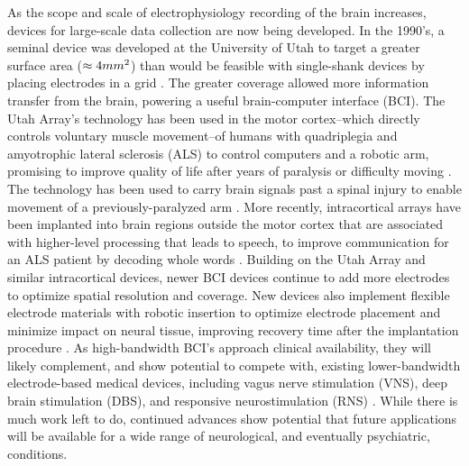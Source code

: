 \documentclass[11pt]{article}
\begin{document}
As the scope and scale of electrophysiology recording of the brain increases, devices for large-scale data collection are now being developed. In the 1990's, a seminal device was developed at the University of Utah to target a greater surface area ($\approx4mm\textsuperscript{2}$) than would be feasible with single-shank devices by placing electrodes in a grid \cite{maynard1997utaharray}. The greater coverage allowed more information transfer from the brain, powering a useful brain-computer interface (BCI). The Utah Array's technology has been used in the motor cortex--which directly controls voluntary muscle movement--of humans with quadriplegia and amyotrophic lateral sclerosis (ALS) to control computers and a robotic arm, promising to improve quality of life after years of paralysis or difficulty moving \cite{kim2008braingate, simeral2011braingate, hochberg2012reach, bacher2015bg}. The technology has been used to carry brain signals past a spinal injury to enable movement of a previously-paralyzed arm \cite{ajiboye2017bciarm}. More recently, intracortical arrays have been implanted into brain regions outside the motor cortex that are associated with higher-level processing that leads to speech, to improve communication for an ALS patient by decoding whole words \cite{card2024neuroprosthesis}. Building on the Utah Array and similar intracortical devices, newer BCI devices continue to add more electrodes to optimize spatial resolution and coverage. New devices also implement flexible electrode materials with robotic insertion to optimize electrode placement and minimize impact on neural tissue, improving recovery time after the implantation procedure \cite{musk2019integrated}. As high-bandwidth BCI's approach clinical availability, they will likely complement, and show potential to compete with, existing lower-bandwidth electrode-based medical devices, including vagus nerve stimulation (VNS), deep brain stimulation (DBS), and responsive neurostimulation (RNS) \cite{pertsch2025neuromod, heck2014rns, geller2018rns}. While there is much work left to do, continued advances show potential that future applications will be available for a wide range of neurological, and eventually psychiatric, conditions.
\end{document}
